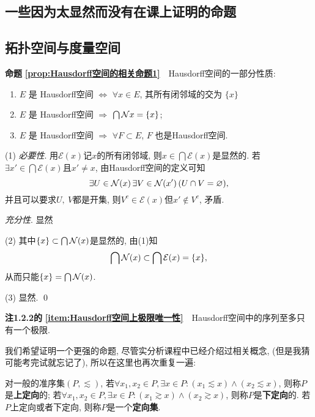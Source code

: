
\begin{appendix}
	
	\chapter{一些因为太显然而没有在课上证明的命题}
	
	\section{拓扑空间与度量空间}
	
	\textbf{命题\,\,\ref{prop:Hausdorff空间的相关命题1}}\ \ Hausdorff空间的一部分性质:
	\begin{enumerate}[(1)]
		\item  $ E $ 是 Hausdorff空间 $ \Longleftrightarrow $ $ \forall x\in E $, 其所有闭邻域的交为 $\{ x \}$
	    \item $ E $ 是 Hausdorff空间 $ \Longrightarrow $ $\bigcap \mathcal{N}{x}=\{x\}$;
	    \item $ E $ 是 Hausdorff空间 $ \Longrightarrow $ $ \forall F\subset E $, $ F $ 也是Hausdorff空间. 
	\end{enumerate}
	\begin{Proof}
	(1) \textsl{必要性}. 用$ \mathcal{E}(x) $记$ x $的所有闭邻域, 则$ x\in\bigcap\mathcal{E}(x) $是显然的. 若$ \exists x'\in\bigcap\mathcal{E}(x) $且$ x'\ne x $, 由Hausdorff空间的定义可知
	\[
	\exists U\in\mathcal{N}({x})\,\exists V\in\mathcal{N}({x'})\,(U\cap V=\varnothing),
	\]
	并且可以要求$ U,\ V $都是开集, 则$ V^c\in\mathcal{E}(x) $但$ x'\notin V^c $, 矛盾.
	
	\textsl{充分性}. 显然
	
	(2) 其中$ \{x\}\subset\bigcap\mathcal{N}({x}) $是显然的, 由(1)知
	\[
	\bigcap\mathcal{N}(x)\subset\bigcap\mathcal{E}(x)=\{x\},
	\]
	从而只能$ \{x\}=\bigcap\mathcal{N}({x}) $.
	
	(3) 显然.	\qed
	\end{Proof}
	
	\textbf{注1.2.2的\,\,\ref{item:Hausdorff空间上极限唯一性}}\ \ Hausdorff空间中的序列至多只有一个极限.
	
	我们希望证明一个更强的命题, 尽管实分析课程中已经介绍过相关概念, (但是我猜可能考完试就忘记了), 所以在这里也再次重复一遍:
	\begin{Definition}
		对一般的准序集$ (P, \lesssim) $, 若$ \forall x_1, x_2\in P, \exists x\in P : (x_1\lesssim x)\land (x_2\lesssim x) $, 则称$ P $是\textbf{上定向}的; 若$ \forall x_1, x_2\in P, \exists x\in P : (x_1\gtrsim x)\land (x_2\gtrsim x) $, 则称$ P $是\textbf{下定向}的. 若$ P $上定向或者下定向, 则称$ P $是一个\textbf{定向集}.
		

\end{Definition}
\end{appendix}
